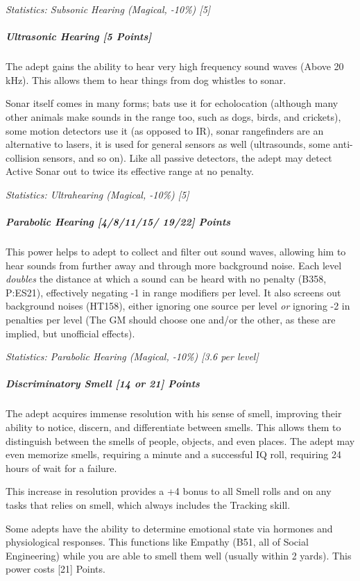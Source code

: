 \begin{multicols*}{3}
		\textcolor{OliveGreen}{\textit{Statistics: Subsonic Hearing (Magical, -10\%) [5] }}
	
	\subparagraph{Ultrasonic Hearing [5 Points]}
	
		The adept gains the ability to hear very high frequency sound waves (Above 20 kHz). This allows them to hear things from dog whistles to sonar. 
		
		Sonar itself comes in many forms; bats use it for echolocation (although many other animals make sounds in the range too, such as dogs, birds, and crickets), some motion detectors use it (as opposed to IR), sonar rangefinders are an alternative to lasers, it is used for general sensors as well (ultrasounds, some anti-collision sensors, and so on). Like all passive detectors, the adept may detect Active Sonar out to twice its effective range at no penalty.
	
		\textcolor{OliveGreen}{\textit{Statistics: Ultrahearing (Magical, -10\%) [5] }}
	
	\subparagraph{Parabolic Hearing [4/8/11/15/ 19/22] Points}
	
		This power helps to adept to collect and filter out sound waves, allowing him to hear sounds from further away and through more background noise. Each level \textit{doubles} the distance at which a sound can be heard with no penalty (B358, P:ES21), effectively negating -1 in range modifiers per level. It also screens out background noises (HT158), either ignoring one source per level \textit{or} ignoring -2 in penalties per level (The GM should choose one and/or the other, as these are implied, but unofficial effects).
	
		\textcolor{OliveGreen}{\textit{Statistics: Parabolic Hearing (Magical, -10\%) [3.6 per level] }}
		
	\subparagraph{Discriminatory Smell [14 or 21] Points}
	
		The adept acquires immense resolution with his sense of smell, improving their ability to notice, discern, and differentiate between smells. This allows them to distinguish between the smells of people, objects, and even places. The adept may even memorize smells, requiring a minute and a successful IQ roll, requiring 24 hours of wait for a failure.
		
		This increase in resolution provides a +4 bonus to all Smell rolls and on any tasks that relies on smell, which always includes the Tracking skill.
		
		Some adepts have the ability to determine emotional state via hormones and physiological responses. This functions like Empathy (B51, all of Social Engineering) while you are able to smell them well (usually within 2 yards). This power costs [21] Points.
	

\end{multicols*}
